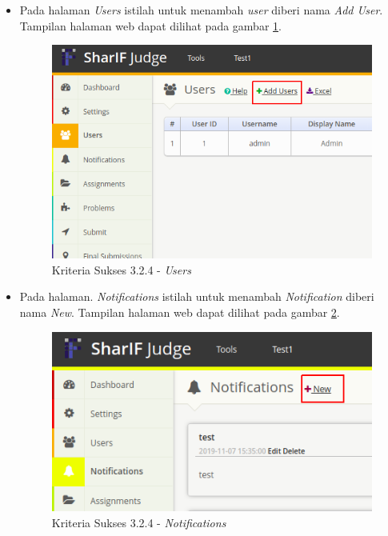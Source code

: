 \documentclass[a4paper,twoside]{article}
\begin{document}
\begin{enumerate}
\begin{itemize}
			\item Pada halaman \textit{Users} istilah untuk menambah \textit{user} diberi nama \textit{Add User}. Tampilan halaman web dapat dilihat pada gambar \ref{fig:kepatuhan_3_2_4_users}.
			\begin{figure}[H]
				\centering  
				\includegraphics[scale=0.5]{kepatuhan_3_2_4_users}  
				\caption[Kriteria Sukses 3.2.4 - \textit{Users}]{Kriteria Sukses 3.2.4 - \textit{Users}} 
				\label{fig:kepatuhan_3_2_4_users} 
			\end{figure}
			
			\item Pada halaman. \textit{Notifications} istilah untuk menambah \textit{Notification} diberi nama \textit{New}. Tampilan halaman web dapat dilihat pada gambar \ref{fig:kepatuhan_3_2_4_notifications}.
			\begin{figure}[H]
				\centering  
				\includegraphics[scale=0.5]{kepatuhan_3_2_4_notifications}  
				\caption[Kriteria Sukses 3.2.4 - \textit{Notifications}]{Kriteria Sukses 3.2.4 - \textit{Notifications}} 
				\label{fig:kepatuhan_3_2_4_notifications} 
			\end{figure}
			

\end{itemize}
\end{enumerate}
\end{document}
